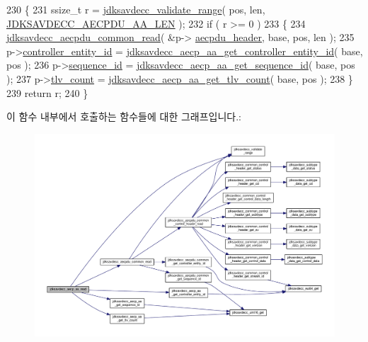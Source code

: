 \begin{DoxyCode}
230 \{
231     ssize\_t r = \hyperlink{group__util_ga9c02bdfe76c69163647c3196db7a73a1}{jdksavdecc\_validate\_range}( pos, len, 
      \hyperlink{group___a_e_c_p___a_a__offsets_ga624792b524d0f0f8ef18c2f4895003aa}{JDKSAVDECC\_AECPDU\_AA\_LEN} );
232     \textcolor{keywordflow}{if} ( r >= 0 )
233     \{
234         \hyperlink{group__aecpdu__common_ga78dffab7a5f742e72d9c58ed9962f1a9}{jdksavdecc\_aecpdu\_common\_read}( &p->
      \hyperlink{structjdksavdecc__aecp__aa_ae8460ae179666e7ce268ed1ef33d0de3}{aecpdu\_header}, base, pos, len );
235         p->\hyperlink{structjdksavdecc__aecp__aa_affc928ddb4fc62d1d04a775d36e5f2c8}{controller\_entity\_id} = 
      \hyperlink{group___a_e_c_p___a_a_gaae2a7787d4f2cac32225db085671d9fb}{jdksavdecc\_aecp\_aa\_get\_controller\_entity\_id}( base, pos );
236         p->\hyperlink{structjdksavdecc__aecp__aa_a8f184eb7c16a6d3a501c383ee8ffa200}{sequence\_id} = \hyperlink{group___a_e_c_p___a_a_gaa3c8603e8ae6975ea642467349cbcb6a}{jdksavdecc\_aecp\_aa\_get\_sequence\_id}( 
      base, pos );
237         p->\hyperlink{structjdksavdecc__aecp__aa_a038fe0548939dfb79822e59885732e2a}{tlv\_count} = \hyperlink{group___a_e_c_p___a_a_ga9bbfb30ebe22ee886ac1b783d64bd1aa}{jdksavdecc\_aecp\_aa\_get\_tlv\_count}( base, pos
       );
238     \}
239     \textcolor{keywordflow}{return} r;
240 \}
\end{DoxyCode}


이 함수 내부에서 호출하는 함수들에 대한 그래프입니다.\+:
\nopagebreak
\begin{figure}[H]
\begin{center}
\leavevmode
\includegraphics[width=350pt]{group___a_e_c_p___a_a_gacc39cba2e86bb37b72b2f300ed45e260_cgraph}
\end{center}
\end{figure}


